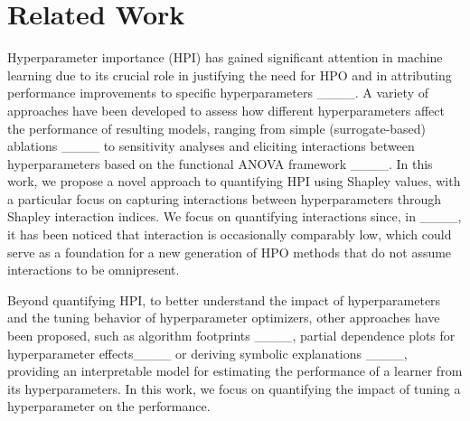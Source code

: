 \section{Related Work}
\label{sec:related-work}

Hyperparameter importance (HPI) has gained significant attention in machine learning due to its crucial role in justifying the need for HPO and in attributing performance improvements to specific hyperparameters ____.
A variety of approaches have been developed to assess how different hyperparameters affect the performance of resulting models, ranging from simple (surrogate-based) ablations ____ to sensitivity analyses and eliciting interactions between hyperparameters based on the functional ANOVA framework ____. 
In this work, we propose a novel approach to quantifying HPI using Shapley values, with a particular focus on capturing interactions between hyperparameters through Shapley interaction indices. We focus on quantifying interactions since, in ____, it has been noticed that interaction is occasionally comparably low, which could serve as a foundation for a new generation of HPO methods that do not assume interactions to be omnipresent.

Beyond quantifying HPI, to better understand the impact of hyperparameters and the tuning behavior of hyperparameter optimizers, other approaches have been proposed, such as algorithm footprints ____, partial dependence plots for hyperparameter effects____ or deriving symbolic explanations ____, providing an interpretable model for estimating the performance of a learner from its hyperparameters. In this work, we focus on quantifying the impact of tuning a hyperparameter on the performance.




